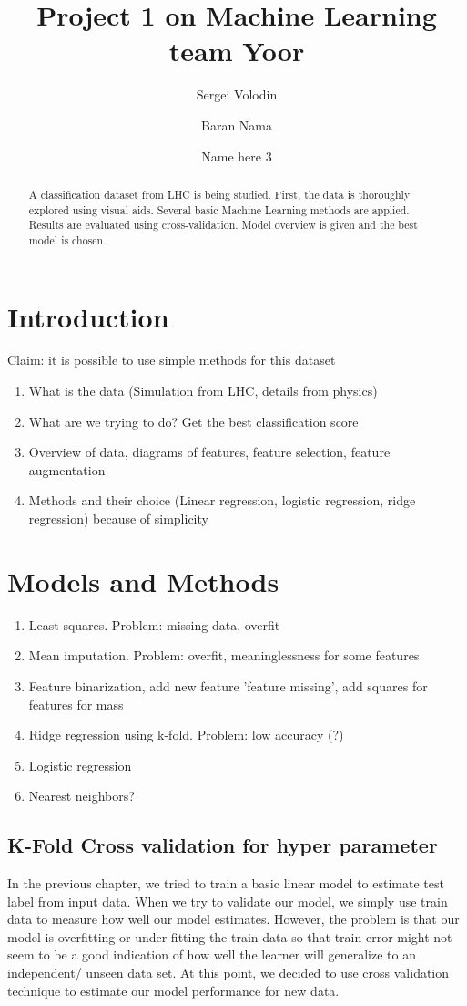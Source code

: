 \documentclass[10pt,conference,compsocconf]{IEEEtran}
\title{Project 1 on Machine Learning team Yoor}
\author[1]{Sergei Volodin}
\author[1]{Baran Nama}
\author[1]{Name here 3}
\affil[1]{EPFL}
\affil[ ]{\textit {\{sergei.volodin,baran.nama,email3\}@epfl.ch}}
\begin{document}
\maketitle

\begin{abstract}
A classification dataset from LHC is being studied. First, the data is thoroughly explored using visual aids. Several basic Machine Learning methods are applied. Results are evaluated using cross-validation. Model overview is given and the best model is chosen.
\end{abstract}

\section{Introduction}
Claim: it is possible to use simple methods for this dataset
\begin{enumerate}
	\item What is the data (Simulation from LHC, details from physics)
	\item What are we trying to do? Get the best classification score
	\item Overview of data, diagrams of features, feature selection, feature augmentation
	\item Methods and their choice (Linear regression, logistic regression, ridge regression) because of simplicity
\end{enumerate}
\section{Models and Methods}
\begin{enumerate}
\item Least squares. Problem: missing data, overfit
\item Mean imputation. Problem: overfit, meaninglessness for some features
\item Feature binarization, add new feature 'feature missing', add squares for features for mass
\item Ridge regression using k-fold. Problem: low accuracy (?)
\item Logistic regression
\item Nearest neighbors?
\end{enumerate}
\subsection{K-Fold Cross validation for hyper parameter}
In the previous chapter, we tried to train a basic linear model to 
estimate test label from input data. When we try to validate our model, 
we simply use train data to measure how well our model estimates. 
However, the problem is that our model is overfitting or under fitting 
the train data so that train error might not seem to be a good 
indication of how well the learner will generalize to an independent/ 
unseen data set. At this point, we decided to use cross validation 
technique to estimate our model performance for new data.\\ 
\end{document}
